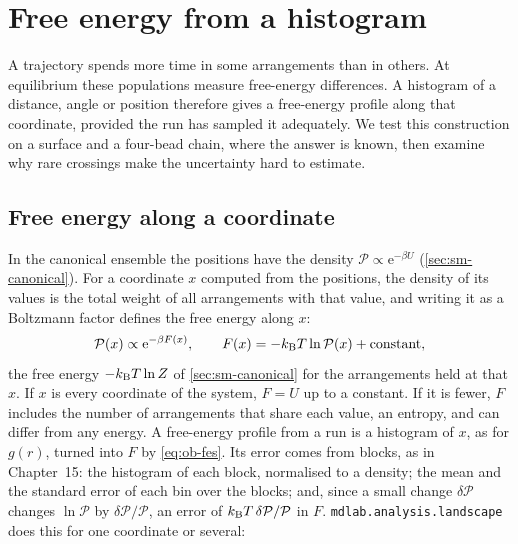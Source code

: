 \section{Free energy from a histogram}
\label{sec:ob-fes}

A trajectory spends more time in some arrangements than in others. At
equilibrium these populations measure free-energy differences. A
histogram of a distance, angle or position therefore gives a free-energy
profile along that coordinate, provided the run has sampled it adequately.
We test this construction on a surface and a four-bead chain, where the
answer is known, then examine why rare crossings make the uncertainty
hard to estimate.

\subsection*{Free energy along a coordinate}

In the canonical ensemble the positions have the density $\mathcal{P}
\propto \mathrm{e}^{-\beta U}$ (\cref{sec:sm-canonical}). For a coordinate
$x$ computed from the positions, the density of its values is the total
weight of all arrangements with that value, and writing it as a Boltzmann
factor defines the free energy along $x$:
\begin{equation}
   \mathcal{P}(x) \propto \mathrm{e}^{-\beta F(x)} , \qquad
   F(x) = -k_{\mathrm{B}} T\ln\mathcal{P}(x) + \text{constant} ,
   \label{eq:ob-fes}
\end{equation}
the free energy $-k_{\mathrm{B}} T\ln Z$ of \cref{sec:sm-canonical} for the
arrangements held at that $x$. If $x$ is every coordinate of the system,
$F = U$ up to a constant. If it is fewer, $F$ includes the number of
arrangements that share each value, an entropy, and can differ from any
energy. A free-energy profile from a run is a histogram of $x$, as for
$g(r)$, turned into $F$ by \cref{eq:ob-fes}. Its error comes from blocks,
as in Chapter~15: the histogram of each block, normalised to a density;
the mean and the standard error of each bin over the blocks; and, since a
small change $\delta\mathcal{P}$ changes $\ln\mathcal{P}$ by
$\delta\mathcal{P}/\mathcal{P}$, an error of $k_{\mathrm{B}} T\,\delta\mathcal{P}/
\mathcal{P}$ in $F$. \texttt{mdlab.analysis.landscape} does this for one
coordinate or several:

